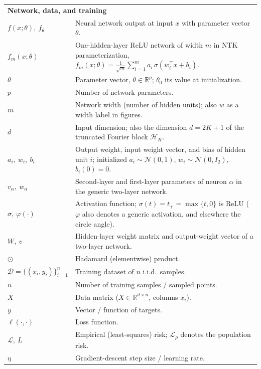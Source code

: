 \begin{longtable}{p{} p{}}
\multicolumn{2}{l}{\textbf{Network, data, and training}}\\[0.3em]
$f(x;\theta),\ f_\theta$ & Neural network output at input $x$ with parameter vector $\theta$. \\[0.4em]
$f_m(x;\theta)$ & One-hidden-layer ReLU network of width $m$ in NTK parameterization, $f_m(x;\theta)=\tfrac{1}{\sqrt{m}}\sum_{i=1}^m a_i\,\sigma(w_i^\top x+b_i)$. \\[0.4em]
$\theta$ & Parameter vector, $\theta\in\mathbb{R}^p$; $\theta_0$ its value at initialization. \\[0.4em]
$p$ & Number of network parameters. \\[0.4em]
$m$ & Network width (number of hidden units); also $w$ as a width label in figures. \\[0.4em]
$d$ & Input dimension; also the dimension $d=2K+1$ of the truncated Fourier block $\mathcal{H}_K$. \\[0.4em]
$a_i,\ w_i,\ b_i$ & Output weight, input weight vector, and bias of hidden unit $i$; initialized $a_i\sim\mathcal{N}(0,1)$, $w_i\sim\mathcal{N}(0,I_2)$, $b_i(0)=0$. \\[0.4em]
$v_\alpha,\ w_\alpha$ & Second-layer and first-layer parameters of neuron $\alpha$ in the generic two-layer network. \\[0.4em]
$\sigma,\ \varphi(\cdot)$ & Activation function; $\sigma(t)=t_+=\max\{t,0\}$ is ReLU ($\varphi$ also denotes a generic activation, and elsewhere the circle angle). \\[0.4em]
$W,\ v$ & Hidden-layer weight matrix and output-weight vector of a two-layer network. \\[0.4em]
$\odot$ & Hadamard (elementwise) product. \\[0.4em]
$\mathcal{D}=\{(x_i,y_i)\}_{i=1}^n$ & Training dataset of $n$ i.i.d.\ samples. \\[0.4em]
$n$ & Number of training samples / sampled points. \\[0.4em]
$X$ & Data matrix ($X\in\mathbb{R}^{d\times n}$, columns $x_i$). \\[0.4em]
$y$ & Vector / function of targets. \\[0.4em]
$\ell(\cdot,\cdot)$ & Loss function. \\[0.4em]
$\mathcal{L},\ L$ & Empirical (least-squares) risk; $\mathcal{L}_\rho$ denotes the population risk. \\[0.4em]
$\eta$ & Gradient-descent step size / learning rate. \\[0.4em]

\end{longtable}
